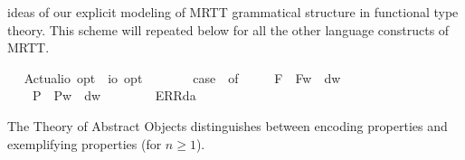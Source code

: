 \begin{isabellebody}
\begin{isamarkuptext}
  ideas of our explicit modeling of MRTT grammatical structure in functional type theory. 
  This scheme will repeated below for all the other language constructs of MRTT.%
\end{isamarkuptext}\isamarkuptrue%
\ \isamarkupfalse%
\ Actual{\isacharcolon}{\isacharcolon}{\isachardoublequoteopen}io\ opt\ {\isasymRightarrow}\ io\ opt{\isachardoublequoteclose}\ {\isacharparenleft}{\isachardoublequoteopen}\isactrlbold {\isasymA}\ {\isacharunderscore}{\isachardoublequoteclose}\ {\isacharbrackleft}{}{}{\isacharbrackright}\ {}{}{\isacharparenright}\ \ {\isachardoublequoteopen}\isactrlbold {\isasymA}{\isasymphi}\ {\isasymequiv}\ case\ {\isasymphi}\ of\ \isanewline
\ \ \ \ F{\isacharparenleft}{\isasympsi}{\isacharparenright}\ {\isasymRightarrow}\ F{\isacharparenleft}{\isasymlambda}w{\isachardot}\ {\isasympsi}\ dw{\isacharparenright}\ {\isacharbar}\ \isanewline
\ \ \ \ P{\isacharparenleft}{\isasympsi}{\isacharparenright}\ {\isasymRightarrow}\ P{\isacharparenleft}{\isasymlambda}w{\isachardot}\ {\isasympsi}\ dw{\isacharparenright}\ {\isacharbar}\ \isanewline
\ \ \ \ {\isacharunderscore}\ {\isasymRightarrow}\ ERR{\isacharparenleft}da{\isacharparenright}{\isachardoublequoteclose}%
\begin{isamarkuptext}%
The Theory of Abstract Objects distinguishes between encoding properties  and 
  exemplifying properties  (for $n\geq 1$). 


\end{isamarkuptext}
\end{isabellebody}
